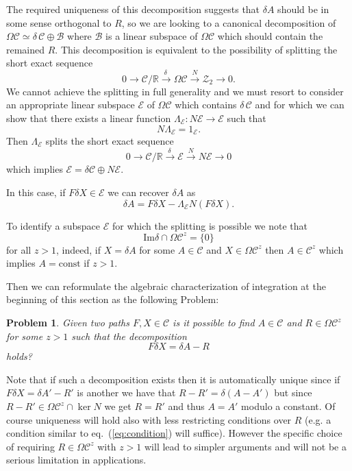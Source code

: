 \documentclass[a4paper,12pt,reqno]{amsproc}
\newcommand{\der}{\delta\!}
\newcommand{\RR}{\mathbb{R}}
\newcommand{\NN}{N}
\newcommand{\CC}{\mathcal{C}}
\newcommand{\ZZ}{\mathcal{Z}}
\newcommand{\OCC}{\Omega \mathcal{C}}
\newtheorem{problem}{Problem}
\begin{document}
The required uniqueness of this decomposition suggests that $\der A$
should be in some sense orthogonal to $R$,  
so we are looking to a canonical decomposition of $\OCC \simeq \der\, \CC
\oplus \mathcal{B}$ where $\mathcal{B}$ is a linear subspace of $\OCC$
which should contain the remained $R$. This decomposition is equivalent to the
possibility of splitting the
short exact sequence
\begin{equation*}
 0 \rightarrow \CC/\RR \stackrel{\der\ }{\longrightarrow} \OCC
 \stackrel{\NN}{\longrightarrow} \ZZ_2 \rightarrow 0.
\end{equation*}
We cannot achieve the splitting in full generality and we must
resort to consider an appropriate linear subspace $\mathcal{E}$ of
$\OCC$ which contains $\der\,\CC$ and for
which we can show that there exists a linear function $\Lambda_{\mathcal{E}} : \NN
\mathcal{E} \to \mathcal{E}$ such that 
$$
\NN \Lambda_{\mathcal{E}} = 1_{\mathcal{E}}.
$$ 
Then $\Lambda_{\mathcal{E}}$ splits the short exact sequence
\begin{equation*}
 0 \rightarrow \mathcal{C}/\mathbb{R} \stackrel{\der\ }{\longrightarrow} \mathcal{E}
 \stackrel{\NN}{\longrightarrow} \NN{\mathcal{E}} \rightarrow 0
\end{equation*}
which implies $\mathcal{E} = \delta \mathcal{C} \oplus \NN \mathcal{E}$.

In this case, if $F \der X \in \mathcal{E}$ we can recover $\der A$ as
\begin{equation}
  \label{eq:split1}
\der A = F \der X - \Lambda_{\mathcal{E}} \NN (F\der X).  
\end{equation}


To identify a subspace $\mathcal{E}$ for which the splitting is possible we
note that $$\text{Im} \delta \cap \OCC^z = \{ 0 \}$$ for all
$z > 1$, indeed, if $X = \der A$ for some $A \in
\CC$ and $X \in \OCC^z$ then  $A \in \CC^z$ which implies $A = \text{const}$ if $z > 1$. 

Then we can reformulate the algebraic characterization of integration at
the beginning of this section as the following Problem:
\begin{problem}
\label{prob:1}
Given
two paths $F,X \in \CC$ is it possible to find $A \in \CC$ and $R \in
\OCC^z$ for some $z > 1$ such that  the decomposition
\begin{equation}
\label{eq:problem0}
  F \der X = \der A - R
\end{equation}
holds?  
\end{problem}
Note that if such a decomposition exists then it is
automatically unique since if $F \der X = \der A' - R'$ is another we have that
$R - R' = \der(A-A')$ but since $R-R' \in \OCC^{z} \cap \ker \NN$ we get $R =
R'$ and thus $A = A'$ modulo a constant. Of course uniqueness will
hold also with less restricting conditions over $R$ (e.g. a condition
similar to eq.~(\ref{eq:condition}) will suffice). However the specific
choice of requiring $R \in \OCC^z$ with $z >1$ will lead to simpler
arguments and will not be a serious limitation in applications.
\end{document}
